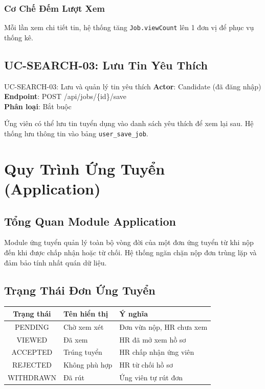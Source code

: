 \documentclass[12pt, a4paper]{report}
\begin{document}
\subsection{Cơ Chế Đếm Lượt Xem}

Mỗi lần xem chi tiết tin, hệ thống tăng \texttt{Job.viewCount} lên 1 đơn vị để phục vụ thống kê.

\section{UC-SEARCH-03: Lưu Tin Yêu Thích}

\begin{requirementbox}{UC-SEARCH-03: Lưu và quản lý tin yêu thích}
\textbf{Actor}: Candidate (đã đăng nhập) \\
\textbf{Endpoint}: POST /api/jobs/\{id\}/save \\
\textbf{Phân loại}: Bắt buộc
\end{requirementbox}

Ứng viên có thể lưu tin tuyển dụng vào danh sách yêu thích để xem lại sau. Hệ thống lưu thông tin vào bảng \texttt{user\_save\_job}.

\chapter{Quy Trình Ứng Tuyển (Application)}

\section{Tổng Quan Module Application}

Module ứng tuyển quản lý toàn bộ vòng đời của một đơn ứng tuyển từ khi nộp đến khi được chấp nhận hoặc từ chối. Hệ thống ngăn chặn nộp đơn trùng lặp và đảm bảo tính nhất quán dữ liệu.

\section{Trạng Thái Đơn Ứng Tuyển}

\begin{center}
\begin{tabular}{|c|p{4cm}|p{7cm}|}
\hline
\textbf{Trạng thái} & \textbf{Tên hiển thị} & \textbf{Ý nghĩa} \\
\hline
PENDING & Chờ xem xét & Đơn vừa nộp, HR chưa xem \\
\hline
VIEWED & Đã xem & HR đã mở xem hồ sơ \\
\hline
ACCEPTED & Trúng tuyển & HR chấp nhận ứng viên \\
\hline
REJECTED & Không phù hợp & HR từ chối hồ sơ \\
\hline
WITHDRAWN & Đã rút & Ứng viên tự rút đơn \\
\hline
\end{tabular}
\end{center}
\end{document}
